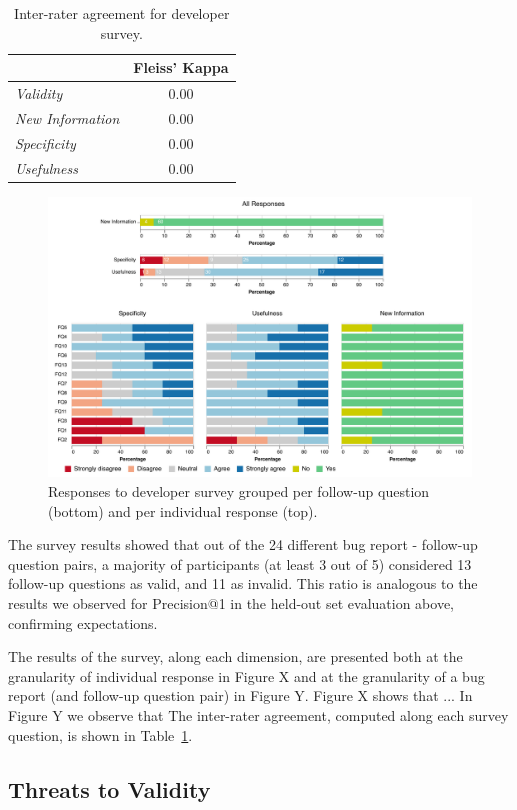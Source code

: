 \begin{table}[t]
\centering
\caption{Inter-rater agreement for developer survey.}
\begin{tabular}{p{3cm}c}
\hline
                          & {\bf Fleiss' Kappa}   \\\hline
{\em Validity}                & 0.00  \\
{\em New Information}         & 0.00  \\
{\em Specificity}             & 0.00  \\
{\em Usefulness}              & 0.00  \\ \hline
\end{tabular}
\label{tab:kappa}
\end{table}

\begin{figure}[t]
\centering
\includegraphics[width=0.99\linewidth]{figures/viz_group.pdf}
\caption{Responses to developer survey grouped per follow-up question (bottom) and per individual response (top).}
\label{fig:survey}
\end{figure}

The survey results showed that out of the 24 different bug report - follow-up question pairs, a majority of participants (at least 3 out of 5) considered 13 follow-up questions as valid, and 11 as invalid. This ratio is analogous to the results we observed for Precision@1 in the held-out set evaluation above, confirming expectations.

The results of the survey, along each dimension, are presented both at the granularity of individual response in Figure X and at the granularity of a bug report (and follow-up question pair) in Figure Y. Figure X shows that ... In Figure Y we observe that
The inter-rater agreement, computed along each survey question, is shown in Table~\ref{tab:kappa}.



\subsection{Threats to Validity}
